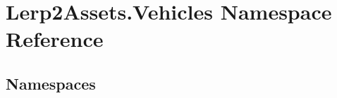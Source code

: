 \hypertarget{namespace_lerp2_assets_1_1_vehicles}{}\section{Lerp2\+Assets.\+Vehicles Namespace Reference}
\label{namespace_lerp2_assets_1_1_vehicles}
\subsection*{Namespaces}
\begin{DoxyCompactItemize}
\end{DoxyCompactItemize}

